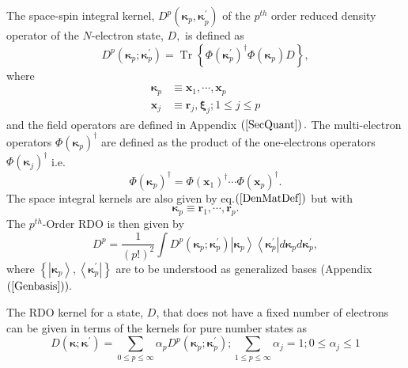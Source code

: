 \documentclass[aps,preprint]{revtex4}%
\begin{document}
\qquad The space-spin integral kernel, $D^{p}\left(  \boldsymbol{\kappa}%
_{p}\boldsymbol{,\kappa}_{p}^{\prime}\right)  $ of the $p^{th}$ order reduced
density operator of the $N$-electron state, $D,$ is defined as%
\begin{equation}
D^{p}\left(  \boldsymbol{\kappa}_{p};\boldsymbol{\kappa}_{p}^{\prime}\right)
=\operatorname{Tr}\left\{  \Phi\left(  \boldsymbol{\kappa}_{p}^{\prime
}\right)  ^{\dagger}\Phi\left(  \boldsymbol{\kappa}_{p}\right)  D\right\}  ,
\label{DenMatDef}%
\end{equation}
where
\begin{align}
\boldsymbol{\kappa}_{p}  &  \equiv\boldsymbol{x}_{1},\cdots,\boldsymbol{x}%
_{p}\\
\boldsymbol{x}_{j}  &  \equiv\boldsymbol{r}_{j}\boldsymbol{,\xi}_{j};1\leq
j\leq p\nonumber
\end{align}
and the field operators are defined in Appendix $\left(  \ref{SecQuant}%
\right)  .$ The multi-electron operators $\Phi\left(  \boldsymbol{\kappa}%
_{p}\right)  ^{\dagger}$ are defined as the product of the one-electrons
operators $\Phi\left(  \boldsymbol{\kappa}_{j}\right)  ^{\dagger}$ i.e.%
\begin{equation}
\Phi\left(  \boldsymbol{\kappa}_{p}\right)  ^{\dagger}=\Phi\left(
\boldsymbol{x}_{1}\right)  ^{\dagger}\cdots\Phi\left(  \boldsymbol{x}%
_{p}\right)  ^{\dagger}.
\end{equation}
The space integral kernels are also given by eq.$\left(  \ref{DenMatDef}%
\right)  $ but with
\begin{equation}
\boldsymbol{\kappa}_{p}\equiv\boldsymbol{r}_{1},\cdots,\boldsymbol{r}_{p}.
\end{equation}
The $p^{th}$-Order RDO is then given by
\begin{equation}
D^{p}=\frac{1}{\left(  p!\right)  ^{2}}\int D^{p}\left(  \boldsymbol{\kappa
}_{p};\boldsymbol{\kappa}_{p}^{\prime}\right)  \left\vert \boldsymbol{\kappa
}_{p}\right\rangle \left\langle \boldsymbol{\kappa}_{p}^{\prime}\right\vert
d\boldsymbol{\kappa}_{p}d\boldsymbol{\kappa}_{p}^{\prime},
\end{equation}
where $\left\{  \left\vert \boldsymbol{\kappa}_{p}\right\rangle ,\left\langle
\boldsymbol{\kappa}_{p}^{\prime}\right\vert \right\}  $ are to be understood
as generalized bases (Appendix $\left(  \ref{Genbasis}\right)  ).$

The RDO kernel for a state, $D$, that does not have a fixed number of
electrons can be given in terms of the kernels for pure number states as
\begin{equation}
D\left(  \boldsymbol{\kappa};\boldsymbol{\kappa}^{\prime}\right)  =\sum_{0\leq
p\leq\infty}\alpha_{p}D^{p}\left(  \boldsymbol{\kappa}_{p};\boldsymbol{\kappa
}_{p}^{\prime}\right)  ;\sum_{1\leq p\leq\infty}\alpha_{j}=1;0\leq\alpha
_{j}\leq1
\end{equation}
\end{document}

